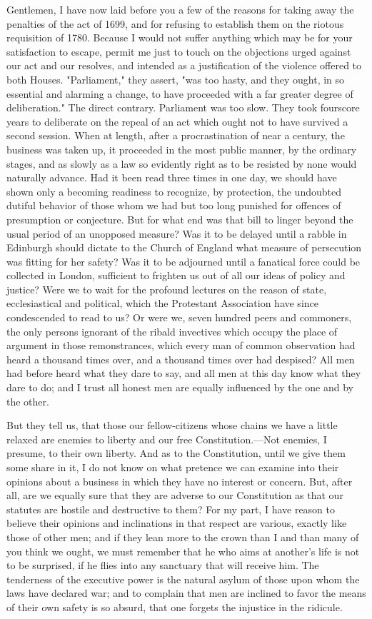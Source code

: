 Gentlemen, I have now laid before you a few of the reasons for taking away the penalties of the act of 1699, and for refusing to establish them on the riotous requisition of 1780. Because I would not suffer anything which may be for your satisfaction to escape, permit me just to touch on the objections urged against our act and our resolves, and intended as a justification of the violence offered to both Houses. "Parliament," they assert, "was too hasty, and they ought, in so essential and alarming a change, to have proceeded with a far greater degree of deliberation." The direct contrary. Parliament was too slow. They took fourscore years to deliberate on the repeal of an act which ought not to have survived a second session. When at length, after a procrastination of near a century, the business was taken up, it proceeded in the most public manner, by the ordinary stages, and as slowly as a law so evidently right as to be resisted by none would naturally advance. Had it been read three times in one day, we should have shown only a becoming readiness to recognize, by protection, the undoubted dutiful behavior of those whom we had but too long punished for offences of presumption or conjecture. But for what end was that bill to linger beyond the usual period of an unopposed measure? Was it to be delayed until a rabble in Edinburgh should dictate to the Church of England what measure of persecution was fitting for her safety? Was it to be adjourned until a fanatical force could be collected in London, sufficient to frighten us out of all our ideas of policy and justice? Were we to wait for the profound lectures on the reason of state, ecclesiastical and political, which the Protestant Association have since condescended to read to us? Or were we, seven hundred peers and commoners, the only persons ignorant of the ribald invectives which occupy the place of argument in those remonstrances, which every man of common observation had heard a thousand times over, and a thousand times over had despised? All men had before heard what they dare to say, and all men at this day know what they dare to do; and I trust all honest men are equally influenced by the one and by the other.

But they tell us, that those our fellow-citizens whose chains we have a little relaxed are enemies to liberty and our free Constitution.—Not enemies, I presume, to their own liberty. And as to the Constitution, until we give them some share in it, I do not know on what pretence we can examine into their opinions about a business in which they have no interest or concern. But, after all, are we equally sure that they are adverse to our Constitution as that our statutes are hostile and destructive to them? For my part, I have reason to believe their opinions and inclinations in that respect are various, exactly like those of other men; and if they lean more to the crown than I and than many of you think we ought, we must remember that he who aims at another's life is not to be surprised, if he flies into any sanctuary that will receive him. The tenderness of the executive power is the natural asylum of those upon whom the laws have declared war; and to complain that men are inclined to favor the means of their own safety is so absurd, that one forgets the injustice in the ridicule.


